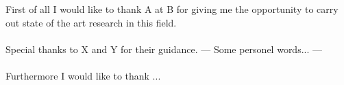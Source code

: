 \thispagestyle{empty}
\vspace*{3cm}




\noindent 
First of all I would like to thank A at  B for giving me the opportunity to carry out state of the art research in this field. 
\\
\\
Special thanks to X and Y for their guidance. --- Some personel words... ---
\\
\\
Furthermore I would like to thank ...
